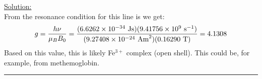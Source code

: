 \noindent
\underline{Solution:}\\

\noindent
From the resonance condition for this line is we get:
$$g = \frac{h\nu}{\mu_BB_0} = \frac{(6.6262\times 10^{-34}\textnormal{ Js})(9.41756\times 10^9\textnormal{ s}^{-1})}{(9.27408\times 10^{-24}\textnormal{ Am}^2)(0.16290\textnormal{ T})} = 4.1308$$
Based on this value, this is likely Fe$^{3+}$ complex (open shell). This could be, for example, from methemoglobin.

\hrule\vspace{0.5cm}
